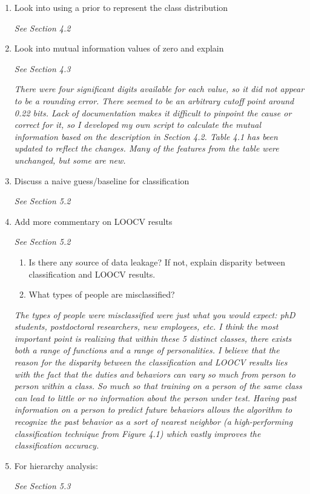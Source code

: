 \documentclass[12pt]{report}
\begin{document}
\begin{enumerate}
    \item Look into using a prior to represent the class distribution
    \par \textit{See Section 4.2}

	\item Look into mutual information values of zero and explain 
	\par \textit{See Section 4.3}
    	\par \textit{There were four significant digits available for each value, so it did not appear to be a rounding error.
    		  There seemed to be an arbitrary cutoff point around 0.22 bits.
    		  Lack of documentation makes it difficult to pinpoint the cause or correct for it, so I developed my own script to calculate the mutual information based on the description in Section 4.2.
    		  Table 4.1 has been updated to reflect the changes.
    		  Many of the features from the table were unchanged, but some are new.}



    \item Discuss a naive guess/baseline for classification
    \par \textit{See Section 5.2}    

	\item Add more commentary on LOOCV results
	\par \textit{See Section 5.2}
    \begin{enumerate}
   	    \item Is there any source of data leakage? If not, explain disparity between classification and LOOCV results.
		\item What types of people are misclassified?


    \end{enumerate}
    		\par \textit{The types of people were misclassified were just what you would expect: phD students, postdoctoral researchers, new employees, etc.
    			I think the most important point is realizing that within these 5 distinct classes, there exists both a range of functions and a range of personalities.
    			I believe that the reason for the disparity between the classification and LOOCV results lies with the fact that the duties and behaviors can vary so much from person to person within a class.
    			So much so that training on a person of the same class can lead to little or no information about the person under test.
    			Having past information on a person to predict future behaviors allows the algorithm to recognize the past behavior as a sort of nearest neighbor (a high-performing classification technique from Figure 4.1) which vastly improves the classification accuracy.}
	\item For hierarchy analysis:
	\par \textit{See Section 5.3}
	

\end{enumerate}
\end{document}
